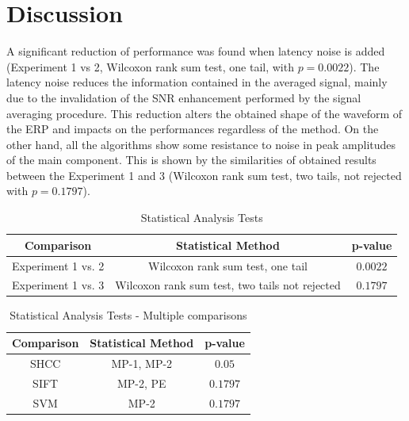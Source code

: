 \documentclass[brainsci,article,submit,moreauthors,pdftex,10pt,a4paper]{mdpi}
\begin{document}
\section{Discussion}
\label{section:discussion}

A significant reduction of performance was found when latency noise is added (Experiment 1 vs 2, Wilcoxon rank sum test, one tail, with $p=0.0022$).  The latency noise reduces the information contained in the averaged signal, mainly due to the invalidation of the SNR enhancement performed by the signal averaging procedure.  This reduction alters the obtained shape of the waveform of the ERP and impacts on the performances regardless of the method. On the other hand, all the algorithms show some resistance to noise in peak amplitudes of the main component. This is shown by the similarities of obtained results between the Experiment 1 and 3 (Wilcoxon rank sum test, two tails, not rejected with $p=0.1797$).

\begin{table}[H]
\caption{Statistical Analysis Tests }
\centering
\begin{tabular}{ccc}
\toprule
\textbf{Comparison}	& \textbf{Statistical Method} &   \textbf{p-value} \\
\midrule
Experiment 1 vs. 2 & Wilcoxon rank sum test, one tail  & $0.0022$ \\
Experiment 1 vs. 3 & Wilcoxon rank sum test, two tails not rejected & $0.1797$ \\
\bottomrule
\end{tabular}
\label{tab:statisticalanalysis1}
\end{table}


\begin{table}[H]
\caption{Statistical Analysis Tests  - Multiple comparisons}
\centering
\begin{tabular}{ccc}
\toprule
\textbf{Comparison}	& \textbf{Statistical Method} &   \textbf{p-value} \\
\midrule
SHCC & MP-1, MP-2  & $0.05$ \\
SIFT   & MP-2, PE       & $0.1797$ \\
SVM   & MP-2             & $0.1797$ \\
\bottomrule
\end{tabular}
\label{tab:statisticalanalysis2}
\end{table}
\end{document}
